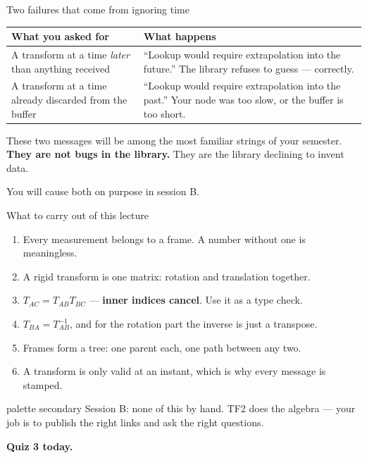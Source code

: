 \documentclass[aspectratio=169]{beamer}
\begin{document}
\begin{frame}{Two failures that come from ignoring time}
  \small
  \begin{center}
  \begin{tabular}{@{}p{4.3cm}p{6.5cm}@{}}
    \toprule
    \textbf{What you asked for} & \textbf{What happens} \\
    \midrule
    A transform at a time \emph{later} than anything received
      & ``Lookup would require extrapolation into the future.'' The library refuses to guess ---
        correctly. \\[0.4em]
    A transform at a time already discarded from the buffer
      & ``Lookup would require extrapolation into the past.'' Your node was too slow, or the
        buffer is too short. \\
    \bottomrule
  \end{tabular}
  \end{center}

  \vspace{0.7em}
  \centering
  These two messages will be among the most familiar strings of your semester. \textbf{They are
  not bugs in the library.} They are the library declining to invent data.

  \vspace{0.4em}
  \footnotesize You will cause both on purpose in session B.
\end{frame}

\begin{frame}{What to carry out of this lecture}
  \begin{enumerate}\small
    \item Every measurement belongs to a frame. A number without one is meaningless.
    \item A rigid transform is one matrix: rotation and translation together.
    \item $T_{AC} = T_{AB}T_{BC}$ --- \textbf{inner indices cancel}. Use it as a type check.
    \item $T_{BA} = T_{AB}^{-1}$, and for the rotation part the inverse is just a transpose.
    \item Frames form a tree: one parent each, one path between any two.
    \item A transform is only valid at an instant, which is why every message is stamped.
  \end{enumerate}

  \vspace{0.8em}
  \begin{beamercolorbox}[sep=6pt,center,rounded=true]{palette secondary}
    \small Session B: none of this by hand. TF2 does the algebra --- your job is to publish the
    right links and ask the right questions.
  \end{beamercolorbox}

  \vspace{0.3em}
  \centering\footnotesize \textbf{Quiz 3 today.}
\end{frame}
\end{document}
